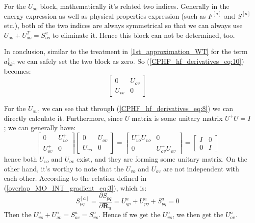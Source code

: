 For the $U_{oo}$ block, mathematically it's related two
indices. Generally in the energy expression as well as physical
properties expression (such as $F^{[a]}$ and $S^{[a]}$ etc.), both of
the two indices are always symmetrical so that we can always use
$U_{oo} + U^{T}_{oo} = S^{a}_{oo}$ to eliminate it. Hence this block
can not be determined, too.

In conclusion, similar to the treatment in \ref{1st_approximation_WT}
for the term $a^{1}_{kk}$; we can safely set the two block as zero. So
(\ref{CPHF_hf_derivatives_eq:10}) becomes:
\begin{equation}
  \label{CPHF_hf_derivatives_eq:12}
  \begin{bmatrix}
    0 & U_{ov} \\
    U_{vo} & 0
  \end{bmatrix}
\end{equation} 

For the $U_{ov}$, we can see that through
(\ref{CPHF_hf_derivatives_eq:8}) we can directly calculate
it. Furthermore, since $U$ matrix is some unitary matrix $U^{+}U = I$;
we can generally have:
\begin{equation}
  \label{CPHF_hf_derivatives_eq:13}
  \begin{bmatrix}
    0 & U^{+}_{vo} \\
    U^{+}_{ov} & 0
  \end{bmatrix}
  \begin{bmatrix}
    0 & U_{ov} \\
    U_{vo} & 0
  \end{bmatrix} =
  \begin{bmatrix}
    U^{+}_{vo}U_{vo} & 0 \\
    0 & U^{+}_{ov}U_{ov}
  \end{bmatrix}
  =   \begin{bmatrix}
    I & 0 \\
    0 & I
  \end{bmatrix}
\end{equation}
hence both $U_{vo}$ and $U_{ov}$ exist, and they are forming some unitary
matrix. On the other hand, it's worthy to note that the $U_{vo}$ and $U_{ov}$
are not independent with each other. According to the relation defined in
(\ref{overlap_MO_INT_gradient_eq:3}), which is:
\begin{equation}
S_{pq}^{[a]} = \frac{\partial S_{pq}}{\partial \bm{R}_{a}} = U^{a}_{qp} +
U^{a}_{pq} + S^{a}_{pq} = 0
\end{equation}
Then the $U^{a}_{vo} + U^{a}_{ov} = S^{a}_{ov} = S^{a}_{vo}$. Hence if we get
the $U^{a}_{vo}$, we then get the $U^{a}_{ov}$. 

